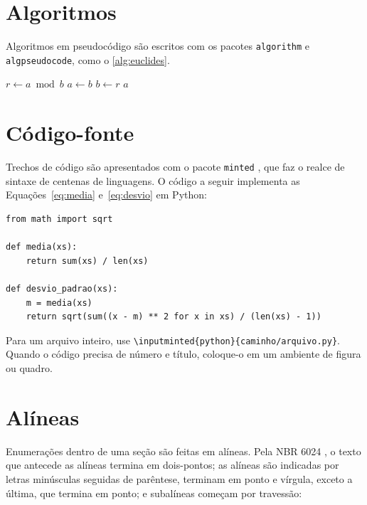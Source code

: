 \documentclass[
	12pt, %
	openright, %
	oneside, %
	a4paper, %
	sumario=tradicional, %
	english, %
	brazil, %
]{abntex2}
\begin{document}
\section{Algoritmos}\label{sec:algoritmos}

Algoritmos em pseudocódigo são escritos com os pacotes \texttt{algorithm} e \texttt{algpseudocode}, como o \autoref{alg:euclides}.

\begin{algorithm}[htbp]
	\caption{Máximo divisor comum (algoritmo de Euclides)}\label{alg:euclides}
	\begin{algorithmic}[1]
				\State $r \gets a \bmod b$
				\State $a \gets b$
				\State $b \gets r$
			\EndWhile
			\State \Return $a$
		\EndFunction
	\end{algorithmic}
\end{algorithm}

\section{Código-fonte}\label{sec:codigo}

Trechos de código são apresentados com o pacote \texttt{minted} \cite{minted}, que faz o realce de sintaxe de centenas de linguagens. O código a seguir implementa as Equações~\ref{eq:media} e~\ref{eq:desvio} em Python:

\begin{verbatim}
from math import sqrt

def media(xs):
    return sum(xs) / len(xs)

def desvio_padrao(xs):
    m = media(xs)
    return sqrt(sum((x - m) ** 2 for x in xs) / (len(xs) - 1))
\end{verbatim}

Para um arquivo inteiro, use \verb|\inputminted{python}{caminho/arquivo.py}|. Quando o código precisa de número e título, coloque-o em um ambiente de figura ou quadro.

\section{Alíneas}\label{sec:alineas}

Enumerações dentro de uma seção são feitas em alíneas. Pela NBR 6024 \cite{abnt6024}, o texto que antecede as alíneas termina em dois-pontos; as alíneas são indicadas por letras minúsculas seguidas de parêntese, terminam em ponto e vírgula, exceto a última, que termina em ponto; e subalíneas começam por travessão:
\end{document}
